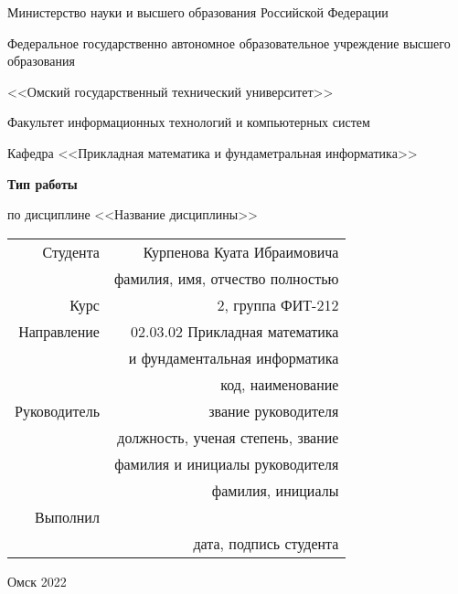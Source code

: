 \documentclass[14pt, a4paper]{article}
\begin{document}
    \pagestyle{empty}

    \begin{center}
        Министерство науки и высшего образования Российской Федерации

        Федеральное государственно автономное образовательное учреждение высшего образования

        <<Омский государственный технический университет>>

        \vspace{1cm}
        Факультет информационных технологий и компьютерных систем

        Кафедра <<Прикладная математика и фундаметральная информатика>>

        \vspace{3cm}
        \textbf{Тип работы}

        по дисциплине <<Название дисциплины>>
    \end{center}
    
    \vspace{3cm}
    \begin{flushright}    
        \begin{tabular}{ r r }
            Студента & Курпенова Куата Ибраимовича \\
            \cline{2-2}
            & \tiny{фамилия, имя, отчество полностью} \\

            Курс & 2, группа ФИТ-212 \\
            \cline{2-2}
            Направление & 02.03.02 Прикладная математика \\
            \cline{2-2}
            & и фундаментальная информатика \\
            \cline{2-2}
            & \tiny{код, наименование} \\
            
            Руководитель & звание руководителя \\
            \cline{2-2}
            & \tiny{должность, ученая степень, звание} \\
            & фамилия и инициалы руководителя \\
            \cline{2-2}
            & \tiny{фамилия, инициалы} \\
            
            Выполнил & \\
            \cline{2-2}
            & \tiny{дата, подпись студента} \\
            
        \end{tabular}
    \end{flushright}
    
    \vspace*{\fill}
    \begin{center}
        Омск 2022
    \end{center}
\end{document}
